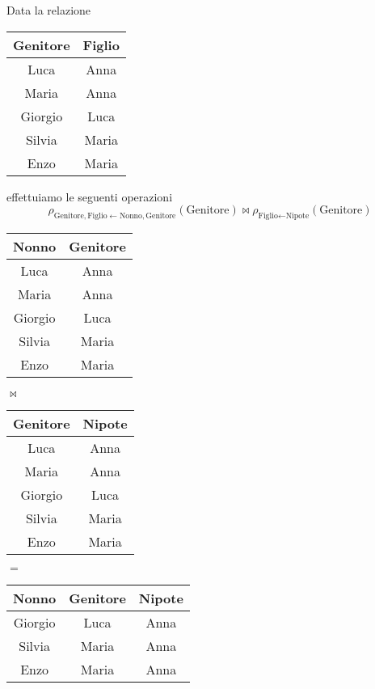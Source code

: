 \begin{example}
	Data la relazione
	\begin{table}[!h]
		\centering
		\begin{tabular}{|c|c|}
			\hline
			\textbf{Genitore} & \textbf{Figlio} \\
			\hline
			Luca & Anna \\
			\hline
			Maria & Anna \\
			\hline
			Giorgio & Luca\\
			\hline
			Silvia & Maria \\
			\hline
			Enzo & Maria\\
			\hline
		\end{tabular}
	\end{table}
	effettuiamo le seguenti operazioni
	\begin{equation*}
		\rho_{\text{Genitore}, \text{Figlio} \leftarrow \text{Nonno}, \text{Genitore}}(\text{Genitore}) \Join \rho_{\text{Figlio} \leftarrow \text{Nipote}}(\text{Genitore})
	\end{equation*}
	\begin{table}[!h]
		\centering
		\begin{tabular}{|c|c|}
			\hline
			\textbf{Nonno} & \textbf{Genitore} \\
			\hline
			Luca & Anna \\
			\hline
			Maria & Anna \\
			\hline
			Giorgio & Luca\\
			\hline
			Silvia & Maria \\
			\hline
			Enzo & Maria\\
			\hline
		\end{tabular}
		\hspace{10pt} $\Join$ \hspace{10pt}
		\begin{tabular}{|c|c|}
			\hline
			\textbf{Genitore} & \textbf{Nipote} \\
			\hline
			Luca & Anna \\
			\hline
			Maria & Anna \\
			\hline
			Giorgio & Luca\\
			\hline
			Silvia & Maria \\
			\hline
			Enzo & Maria\\
			\hline
		\end{tabular}
		\hspace{10pt} $=$ \hspace{10pt}
		\begin{tabular}{|c|c|c|}
			\hline
			\textbf{Nonno} & \textbf{Genitore} & \textbf{Nipote} \\
			\hline
			Giorgio & Luca & Anna \\
			\hline
			Silvia & Maria & Anna \\
			\hline
			Enzo & Maria & Anna \\
			\hline
		\end{tabular}
	\end{table}
\end{example}

